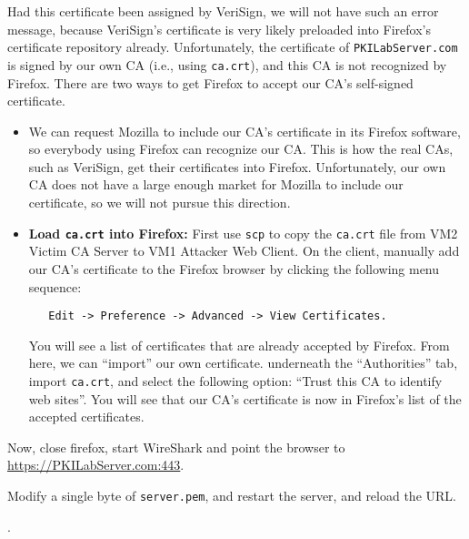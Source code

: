 \documentclass{article}
\begin{document}
Had this certificate been assigned by VeriSign, we will not have such an error
message, because VeriSign's certificate is very likely preloaded into
Firefox's certificate repository already. Unfortunately, the 
certificate of {\tt PKILabServer.com} is signed by our own CA (i.e., using 
{\tt ca.crt}), and this CA is not recognized by Firefox. There are two ways to
get Firefox to accept our CA's self-signed certificate. 
\begin{itemize}
\item We can request Mozilla to include our CA's certificate in its 
Firefox software, 
so everybody using Firefox can recognize our CA.
This is how the real CAs, such as VeriSign, 
get their certificates into Firefox. Unfortunately, our own CA does not 
have a large enough market for Mozilla to include our certificate,
so we will not pursue this direction.

\item {\bf Load {\tt ca.crt} into Firefox:} First use {\tt scp} to copy the {\tt ca.crt} file from VM2 Victim CA Server to VM1 Attacker Web Client.  On the client, manually add our CA's certificate to the Firefox browser by clicking
the following menu sequence:
\begin{verbatim} 
   Edit -> Preference -> Advanced -> View Certificates.
\end{verbatim} 
You will see a list of certificates that are already accepted by Firefox. From here, we 
can ``import'' our own certificate. underneath the ``Authorities'' tab, import {\tt ca.crt}, and select the
following option: ``Trust this CA to identify web sites''.  You will see that 
our CA's certificate is now in Firefox's list of the accepted certificates.
\end{itemize}

Now, close firefox, start WireShark and point the browser to \url{https://PKILabServer.com:443}. 



Modify a single byte of {\tt server.pem}, and restart the server, and reload the URL. 
      
      

. 
\end{document}
